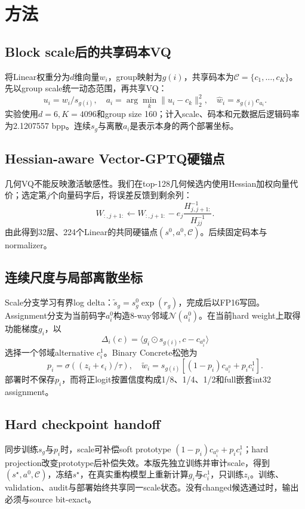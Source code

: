 \section{方法}
\subsection{Block scale后的共享码本VQ}
将Linear权重分为$d$维向量$w_i$，group映射为$g(i)$，共享码本为$\mathcal C=\{c_1,\ldots,c_K\}$。先以group scale统一动态范围，再共享VQ：
\begin{equation}
u_i=w_i/s_{g(i)},\quad a_i=\arg\min_k\|u_i-c_k\|_2^2,\quad \hat w_i=s_{g(i)}c_{a_i}.
\end{equation}
实验使用$d=6,K=4096$和group size 160；计入scale、码本和元数据后逻辑码率为2.1207557 bpp。连续$s_g$与离散$a_i$是表示本身的两个部署坐标。

\subsection{Hessian-aware Vector-GPTQ硬锚点}
几何VQ不能反映激活敏感性。我们在top-128几何候选内使用Hessian加权向量代价；选定第$j$个向量码字后，将误差反馈到剩余列：
\begin{equation}
W_{:,j+1:}\leftarrow W_{:,j+1:}-e_j\frac{H^{-1}_{j,j+1:}}{H^{-1}_{jj}}.
\end{equation}
由此得到32层、224个Linear的共同硬锚点$(s^0,a^0,\mathcal C)$。后续固定码本与normalizer。

\subsection{连续尺度与局部离散坐标}
Scale分支学习有界log delta：$\tilde s_g=s_g^0\exp(r_g)$，完成后以FP16写回。Assignment分支为当前码字$a_i^0$构造8-way邻域$\mathcal N(a_i^0)$。在当前hard weight上取得功能梯度$g_i$，以
\begin{equation}
\Delta_i(c)=\langle g_i\odot s_{g(i)},c-c_{a_i^0}\rangle
\end{equation}
选择一个邻域alternative $c_i^1$。Binary Concrete松弛为
\begin{equation}
p_i=\sigma((z_i+\epsilon_i)/\tau),\quad
\tilde w_i=s_{g(i)}[(1-p_i)c_{a_i^0}+p_ic_i^1].
\end{equation}
部署时不保存$p_i$，而将正logit按置信度构成1/8、1/4、1/2和full嵌套int32 assignment。

\subsection{Hard checkpoint handoff}
同步训练$s_g$与$p_i$时，scale可补偿soft prototype $(1-p_i)c_{a_i^0}+p_ic_i^1$；hard projection改变prototype后补偿失效。本版先独立训练并审计scale，得到$(s^\star,a^0,\mathcal C)$，冻结$s^\star$，在真实重构模型上重新计算$g_i$与$c_i^1$，只训练$z_i$。训练、validation、audit与部署始终共享同一scale状态。没有changed候选通过时，输出必须与source bit-exact。

